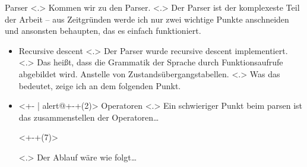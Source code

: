   \begin{frame}{Parser}
    \pause
        \note[item]<.>{
          Kommen wir zu den Parser.
        }
        \note[item]<.>{
          Der Parser ist der komplexeste Teil der Arbeit -- aus Zeitgründen werde ich nur zwei wichtige Punkte anschneiden und ansonsten behaupten, das es einfach funktioniert.
        }
    \begin{itemize}[<+- | alert@+>]
      \item
        Recursive descent
            \note[item]<.>{
              Der Parser wurde recursive descent implementiert.
            }
            \note[item]<.>{
              Das heißt, dass die Grammatik der Sprache durch Funktionsaufrufe abgebildet wird. Anstelle von Zustandsübergangstabellen.
            }
            \note[item]<.>{
              Was das bedeutet, zeige ich an dem folgenden Punkt.
            }
      \item<+- | alert@+-+(2)>
        Operatoren
            \note[item]<.>{
              Ein schwieriger Punkt beim parsen ist das zusammenstellen der Operatoren\ldots
            }


          \begin{uncoverenv}<+-+(7)>%
          \end{uncoverenv}
              \note[item]<.>{
                Der Ablauf wäre wie folgt\ldots
              }


\end{itemize}
\end{frame}
